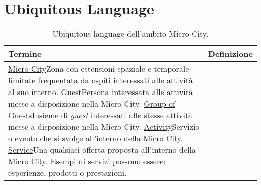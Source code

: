 \section{Ubiquitous Language}
\begin{table}[H]
    \centering
    \begin{tabular}{|l|p{}|}
        \hline
         \textbf{Termine} & \textbf{Definizione}\\
         \hline
         \ul{Micro City}{Zona con estensioni spaziale e temporale limitate frequentata da ospiti interessati alle attività al suo interno.}
         \ul{Guest}{Persona interessata alle attività messe a disposizione nella Micro City.}
         \ul{Group of Guests}{Insieme di \textit{guest} interessati alle stesse attività messe a disposizione nella Micro City.}
         \ul{Activity}{Servizio o evento che si svolge all'interno della Micro City.}
         \ul{Service}{Una qualsiasi offerta proposta all'interno della Micro City. Esempi di servizi possono essere:
         esperienze, prodotti o prestazioni.}
    \end{tabular}
    \caption{Ubiquitous language dell'ambito Micro City.}
    \label{tab:ul}
\end{table}
